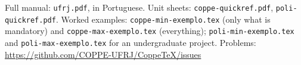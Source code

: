 \documentclass[a4paper,10pt]{article}
\begin{document}
\vfill
\begin{center}\small
Full manual: \texttt{ufrj.pdf}, in Portuguese.\quad
Unit sheets: \texttt{coppe-quickref.pdf}, \texttt{poli-quickref.pdf}.\quad
Worked examples: \texttt{coppe-min-exemplo.tex} (only what is mandatory) and \texttt{coppe-max-exemplo.tex} (everything); \texttt{poli-min-exemplo.tex} and \texttt{poli-max-exemplo.tex} for an undergraduate project.\quad
Problems: \url{https://github.com/COPPE-UFRJ/CoppeTeX/issues}
\end{center}
\end{document}

